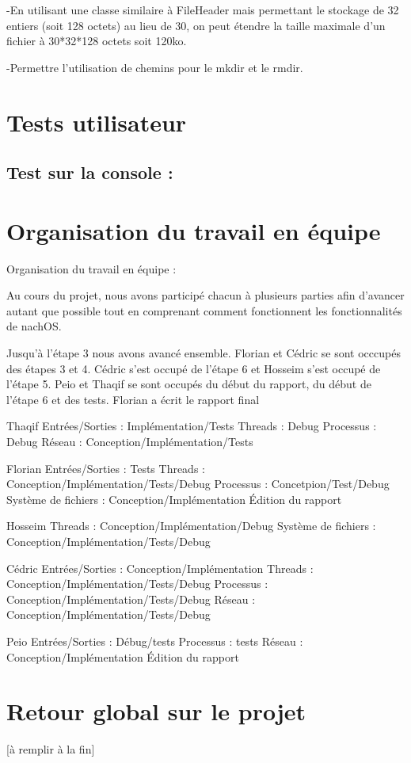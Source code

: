 \documentclass[12pt]{report}
\begin{document}
-En utilisant une classe similaire à FileHeader mais permettant le stockage de 32 entiers (soit 128 octets) au lieu de 30, on peut étendre la taille maximale d'un fichier à 30*32*128 octets soit 120ko.

-Permettre l'utilisation de chemins pour le mkdir et le rmdir.




\chapter{Tests utilisateur}
\section{Test sur la console :}



\chapter{Organisation du travail en équipe}

Organisation du travail en équipe :

Au cours du projet, nous avons participé chacun à plusieurs parties afin d'avancer autant que possible tout en comprenant
comment fonctionnent les fonctionnalités de nachOS.
\bigskip

Jusqu'à l'étape 3 nous avons avancé ensemble. 
Florian et Cédric se sont occcupés des étapes 3 et 4. 
Cédric s'est occupé de l'étape 6 et Hosseim s'est occupé de l'étape 5.
Peio et Thaqif se sont occupés du début du rapport, du début de l'étape 6 et des tests.
Florian a écrit le rapport final
\bigskip

Thaqif
Entrées/Sorties : Implémentation/Tests
Threads : Debug
Processus : Debug
Réseau : Conception/Implémentation/Tests
\bigskip 
 
Florian
Entrées/Sorties : Tests
Threads : Conception/Implémentation/Tests/Debug
Processus : Concetpion/Test/Debug
Système de fichiers : Conception/Implémentation
Édition du rapport
\bigskip 

Hosseim
Threads : Conception/Implémentation/Debug
Système de fichiers : Conception/Implémentation/Tests/Debug
\bigskip

Cédric
Entrées/Sorties : Conception/Implémentation
Threads : Conception/Implémentation/Tests/Debug
Processus : Conception/Implémentation/Tests/Debug
Réseau : Conception/Implémentation/Tests/Debug
\bigskip

Peio
Entrées/Sorties : Débug/tests
Processus : tests
Réseau : Conception/Implémentation
Édition du rapport




\chapter{Retour global sur le projet}

[à remplir à la fin]
\end{document}
